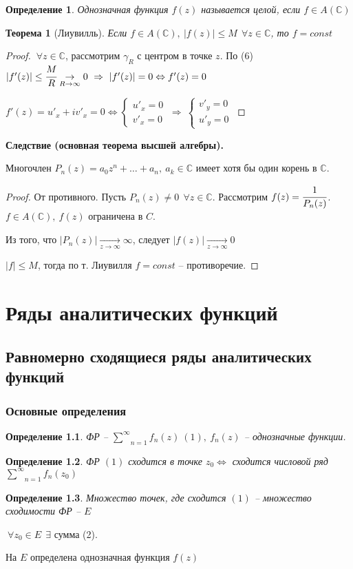 \documentclass[final]{report}
\newcommand{\then}{\ \Rightarrow\ }
\renewcommand{\C}{\mathbb{C}}
\newcommand{\msum}[2]{\underset{#1}{\overset{#2}{\sum}}}
\newcommand{\LRA}{\Leftrightarrow}
\newcommand{\g}{\gamma}
\newcommand{\E}{\ \exists}
\newcommand{\F}{\ \forall}
\newcommand{\sys}[1]{\left\{\begin{matrix}#1\end{matrix}\right.}
\newcommand{\opr}[1]{\begin{opred}#1\end{opred}}
\newtheorem*{theor}{Теорема}
\newtheorem*{opred}{Определение}
\theoremstyle{remark}
\begin{document}
\opr{Однозначная функция $f(z)$ называется целой, если $f\in A(\C)$}
\begin{theor}[Лиувилль]
Если $f\in A(\C),\ |f(z)|\leq M\ \F z\in \C$, то $f=const$
\end{theor}
\begin{proof}
$\F z\in\C$, рассмотрим $\g_R$ с центром в точке $z$. По (6) $|f'(z)|\leq \cfrac MR\underset{R\to\infty}{\to} 0 \then |f'(z)|=0 \LRA f'(z)=0$

$f'(z)=u'_x+iv'_x=0\LRA \sys{u'_x=0 \\ v'_x=0} \then \sys{v'_y=0 \\ u'_y=0}$
\end{proof}
{\bfseries Следствие (основная теорема высшей алгебры).}

Многочлен $P_n(z)=a_0z^n+\ldots+a_n,\ a_k\in\C$ имеет хотя бы один корень в $\C$.
\begin{proof}
От противного. Пусть $P_n(z)\neq0\ \F z\in\C$. Рассмотрим $f(z)=\cfrac 1{P_n(z)}$. $f\in A(\C),\ f(z)$ ограничена в $C$.

Из того, что $|P_n(z)|\underset{z\to\infty}{\to}\infty$, следует $|f(z)|\underset{z\to\infty}{\to}0$

$|f|\leq M$, тогда по т. Лиувилля $f=const$ -- противоречие.
\end{proof}

\chapter{Ряды аналитических функций}

%
\section{Равномерно сходящиеся ряды аналитических функций}

\subsection{Основные определения}

\opr{ФР -- $\msum{n=1}{\infty}f_n(z)\ (1),\ f_n(z)$ -- однозначные функции.}

\opr{ФР $(1)$ сходится в точке $z_0\LRA$ сходится числовой ряд $\msum{n=1}{\infty}f_n(z_0)$}

\opr{Множество точек, где сходится $(1)$ -- множество сходимости ФР -- $E$}

$\F z_0\in E\ \E$ сумма (2).

На $E$ определена однозначная функция $f(z)$
\end{document}
